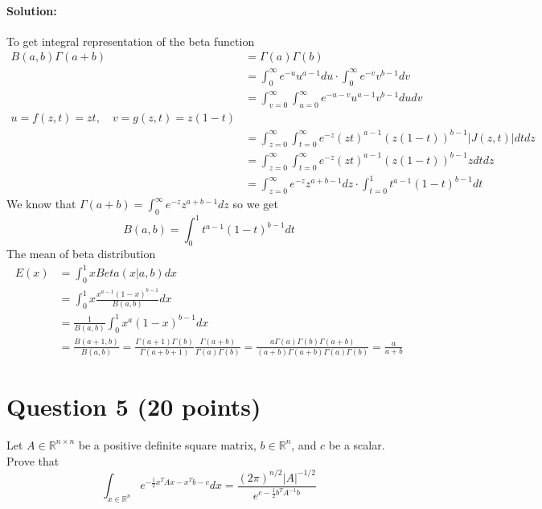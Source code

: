 \documentclass[
	10pt, %
]{../fphw}
\begin{document}
	\paragraph{Solution:} To get integral representation of the beta function
	\begin{align*}
		B(a,b)\Gamma(a+b) &= \Gamma(a)\Gamma(b)\\
		&= \int_{0}^{\infty}e^{-u}u^{a-1}du \cdot \int_{0}^{\infty}e^{-v}v^{b-1}dv\\
		&= \int_{v=0}^{\infty}\int_{u=0}^{\infty}e^{-u-v}u^{a-1}v^{b-1}dudv\\
		u=f(z,t)=zt,\quad v=g(z,t)=z(1-t)\\
		&= \int_{z=0}^{\infty}\int_{t=0}^{\infty} e^{-z}(zt)^{a-1}(z(1-t))^{b-1}|J(z,t)|dtdz\\
		&= \int_{z=0}^{\infty}\int_{t=0}^{\infty} e^{-z}(zt)^{a-1}(z(1-t))^{b-1}zdtdz\\
		&= \int_{z=0}^{\infty}e^{-z}z^{a+b-1}dz \cdot \int_{t=0}^{1}t^{a-1}(1-t)^{b-1}dt
	\end{align*}
	We know that $\Gamma(a+b)=\int_{0}^{\infty}e^{-z}z^{a+b-1}dz$ so we get
	\begin{equation*}
		B(a,b) = \int_{0}^{1}t^{a-1}(1-t)^{b-1}dt
	\end{equation*}
	The mean of beta distribution
	\begin{align*}
		E(x) &= \int_{0}^{1}xBeta(x|a,b)dx\\
		&= \int_{0}^{1}x\frac{x^{a-1}(1-x)^{b-1}}{B(a,b)}dx\\
		&= \frac{1}{B(a,b)}\int_{0}^{1}x^a(1-x)^{b-1}dx\\
		&= \frac{B(a+1,b)}{B(a,b)} 
		= \frac{\Gamma(a+1)\Gamma(b)}{\Gamma(a+b+1)} \frac{\Gamma(a+b)}{\Gamma(a)\Gamma(b)} 
		= \frac{a\Gamma(a)\Gamma(b)\Gamma(a+b)} {(a+b)\Gamma(a+b)\Gamma(a)\Gamma(b)} 
		= \frac{a}{a+b}
	\end{align*}
	
	\section*{Question 5 (20 points)}
	\begin{problem}
		Let $A\in\mathbb{R}^{n\times n}$ be a positive definite square matrix, $b\in\mathbb{R}^n$, and $c$ be a scalar. Prove that
		\begin{equation*}
			\int_{x\in\mathbb{R}^n} e^{-\frac{1}{2}x^TAx-x^Tb-c} dx 
			= \frac{(2\pi)^{n/2}|A|^{-1/2}}{e^{c-\frac{1}{2}b^TA^{-1}b}}
		\end{equation*}
	\end{problem}
\end{document}
